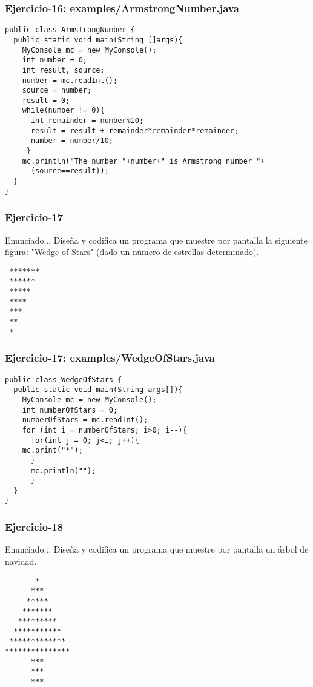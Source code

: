 \documentclass[xcolor=dvipsnames,dvip,notes=show,handout,table]{beamer}
\begin{document}
\begin{frame}[fragile]
\frametitle{Ejercicio-16: examples/ArmstrongNumber.java}
\scriptsize
\begin{lstlisting}
public class ArmstrongNumber {
  public static void main(String []args){
    MyConsole mc = new MyConsole();
    int number = 0;
    int result, source;
    number = mc.readInt();
    source = number;
    result = 0;
    while(number != 0){
      int remainder = number%10;
      result = result + remainder*remainder*remainder;
      number = number/10;
     }
    mc.println("The number "+number+" is Armstrong number "+
      (source==result));        
  }
}
\end{lstlisting}
\end{frame}


\begin{frame}[fragile]
\frametitle{Ejercicio-17}
\begin{block}{Enunciado...}
 Diseña y codifica un programa que muestre por pantalla la siguiente figura: "Wedge of Stars" (dado un número de estrellas determinado).
\end{block}

\begin{lstlisting}
 *******
 ******
 *****
 ****
 ***
 **
 *
\end{lstlisting}



\end{frame}


\begin{frame}[fragile]
\frametitle{Ejercicio-17: examples/WedgeOfStars.java}
\scriptsize
\begin{lstlisting}
public class WedgeOfStars {
  public static void main(String args[]){
    MyConsole mc = new MyConsole();
    int numberOfStars = 0;
    numberOfStars = mc.readInt();
    for (int i = numberOfStars; i>0; i--){
      for(int j = 0; j<i; j++){
	mc.print("*");
      }
      mc.println("");
      }
  }
}
\end{lstlisting}
\end{frame}




\begin{frame}[fragile]
\frametitle{Ejercicio-18}
\begin{block}{Enunciado...}
 Diseña y codifica un programa que muestre por pantalla un árbol de navidad.
\end{block}

\begin{lstlisting}
       *
      ***
     *****
    *******
   *********
  ***********
 *************
***************
      ***
      ***
      ***
\end{lstlisting}



\end{frame}
\end{document}
